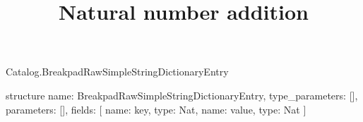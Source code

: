 \begin{lexlean}{Catalog.BreakpadRawSimpleStringDictionaryEntry}
\title{Natural number addition}
\begin{semanticmodule}
structure{
  name: BreakpadRawSimpleStringDictionaryEntry,
  type_parameters: [],
  parameters: [],
  fields: [
    {name: key, type: Nat},
    {name: value, type: Nat}
  ]
}
\end{semanticmodule}
\end{lexlean}
